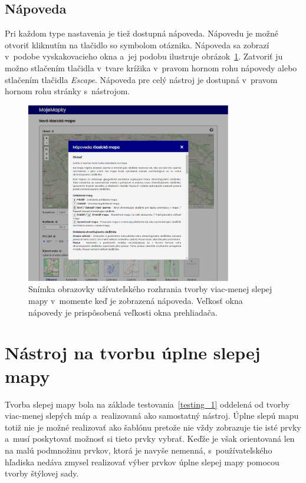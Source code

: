 \subsection*{Nápoveda}
\label{map_hint}
Pri každom type nastavenia je tiež dostupná nápoveda. Nápovedu je možné otvoriť kliknutím na tlačidlo so symbolom otáznika. Nápoveda sa zobrazí v~podobe vyskakovacieho okna a~jej podobu ilustruje obrázok~\ref{img_hint}. Zatvoriť ju možno stlačením tlačidla v~tvare krížika v~pravom hornom rohu nápovedy alebo stlačením tlačidla {\it Escape}. Nápoveda pre celý nástroj je dostupná v~pravom hornom rohu stránky s~nástrojom.

\begin{figure}[hbt]
	\centering
	\includegraphics[width=0.8\textwidth]{obrazky-figures/img_hint.png}
	\caption{Snímka obrazovky užívateľského rozhrania tvorby viac-menej slepej mapy v~momente keď je zobrazená nápoveda. Veľkosť okna nápovedy je prispôsobená veľkosti okna prehliadača.}
	\label{img_hint}
\end{figure}


\section{Nástroj na tvorbu úplne slepej mapy}
Tvorba slepej mapy bola na základe testovania~\ref{testing_1} oddelená od tvorby viac-menej slepých máp a~realizovaná ako samostatný nástroj. Úplne slepú mapu totiž nie je možné realizovať ako šablónu pretože nie vždy zobrazuje tie isté prvky a~musí poskytovať možnosť si tieto prvky vybrať. Keďže je však orientovaná len na malú podmnožinu prvkov, ktorá je navyše nemenná, s~používateľského hľadiska nedáva zmysel realizovať výber prvkov úplne slepej mapy pomocou tvorby štýlovej sady.


